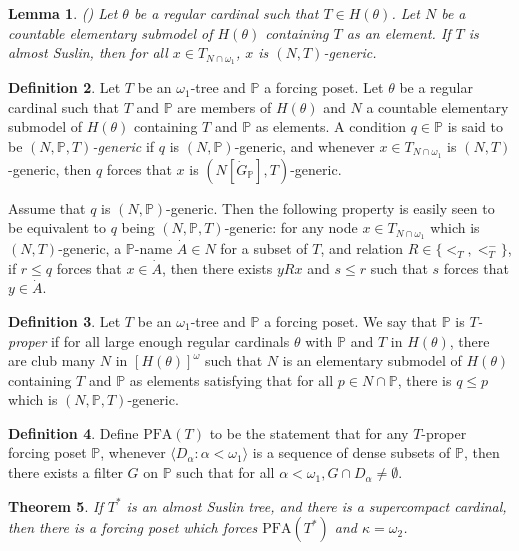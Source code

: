 \documentclass{amsart}
\newtheorem{theorem}{Theorem}[section]
\newtheorem{lemma}[theorem]{Lemma}
\theoremstyle{definition}
\newtheorem{definition}[theorem]{Definition}
\newcommand{\al}{\omega_1}
\renewcommand{\P}{\mathbb{P}}
\newcommand{\PFA}{\mathrm{PFA}}
\begin{document}
\begin{lemma}{\rm (\cite[Lemma 1.5]{Krueger2020})} Let $\theta$ be a regular cardinal such that $T \in
  H(\theta)$.  Let $N$ be a countable elementary submodel of $H(\theta)$
  containing $T$ as an element.  If $T$ is almost Suslin, then for all
  $x \in T_{N\cap\al}$, $x$ is $(N, T)$-generic.
\end{lemma}

\begin{definition} Let $T$ be an $\omega_1$-tree and $\mathbb{P}$ a
  forcing poset. Let $\theta$ be a regular cardinal such that $T$ and
  $\mathbb{P}$ are members of $H(\theta)$ and $N$ a countable elementary
  submodel of $H(\theta)$ containing $T$ and $ \mathbb{P}$ as
  elements. A condition $q \in \mathbb{P}$ is said to be \emph{$(N,
    \mathbb{P}, T )$-generic} if $q$ is $(N,\mathbb{P})$-generic, and
  whenever $x \in T_{N \cap \omega_1}$ is $(N, T )$-generic, then $q$
  forces that $x$ is $(N[\dot G_\mathbb{P}],T)$-generic.
\end{definition}

Assume that $q$ is $(N, \mathbb{P})$-generic. Then the following
property is easily seen to be equivalent to $q$ being
$(N,\P,T)$-generic: for any node $x \in T_{N\cap{\al}}$ which is
$(N,T)$-generic, a $\P$-name $\dot A \in N$ for a subset of $T$, and
relation $R \in \{<_{T},<_{T}^- \}$, if $r \leq q$ forces that
$x\in\dot A$, then there exists $y R x$ and $s \leq r$ such that $s$
forces that $y\in \dot A$.

\begin{definition} Let $T$ be an $\al$-tree and $\P$ a forcing
  poset. We say that $\P$ is \emph{$T$-proper} if for all large enough
  regular cardinals $\theta$ with $\P$ and $T$ in $H(\theta)$, there are
  club many $N$ in $[H(\theta)]^\omega$ such that $N$ is an elementary
  submodel of $H(\theta)$ containing $T$ and $\P$ as elements satisfying that
  for all $p \in N \cap \P$, there is $q \leq p$ which is $(N, \P, T)$-generic.
\end{definition}

\begin{definition} Define $\PFA(T)$ to be the statement that for
  any $T$-proper forcing poset $\P$, whenever $\langle D_\alpha :
  \alpha <\al \rangle$ is a sequence of dense subsets of $\P$, then
  there exists a filter $G$ on $\P$ such that for all $\alpha<\al, G\cap
  D_\alpha \ne \emptyset$.
\end{definition}

\begin{theorem}
  If $T^{*}$ is an almost Suslin tree, and there is a supercompact
  cardinal, then there is a forcing poset which forces
  $\PFA(T^{*})$ and $\kappa = \omega_{2}$.
\end{theorem}
\end{document}
